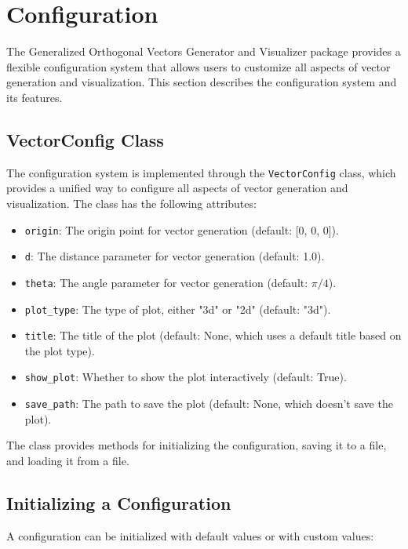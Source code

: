 \section{Configuration}

The Generalized Orthogonal Vectors Generator and Visualizer package provides a flexible configuration system that allows users to customize all aspects of vector generation and visualization. This section describes the configuration system and its features.

\subsection{VectorConfig Class}

The configuration system is implemented through the \texttt{VectorConfig} class, which provides a unified way to configure all aspects of vector generation and visualization. The class has the following attributes:

\begin{itemize}
    \item \texttt{origin}: The origin point for vector generation (default: [0, 0, 0]).
    \item \texttt{d}: The distance parameter for vector generation (default: 1.0).
    \item \texttt{theta}: The angle parameter for vector generation (default: $\pi/4$).
    \item \texttt{plot\_type}: The type of plot, either "3d" or "2d" (default: "3d").
    \item \texttt{title}: The title of the plot (default: None, which uses a default title based on the plot type).
    \item \texttt{show\_plot}: Whether to show the plot interactively (default: True).
    \item \texttt{save\_path}: The path to save the plot (default: None, which doesn't save the plot).
\end{itemize}

The class provides methods for initializing the configuration, saving it to a file, and loading it from a file.

\subsection{Initializing a Configuration}

A configuration can be initialized with default values or with custom values:

